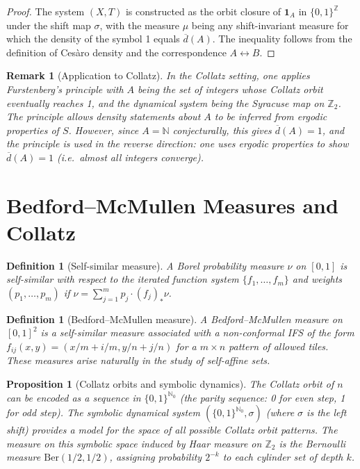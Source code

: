 \documentclass[12pt,a4paper]{article}
\newtheorem{proposition}[theorem]{Proposition}
\newtheorem{definition}[theorem]{Definition}
\newtheorem{remark}[theorem]{Remark}
\begin{document}
\begin{proof}
The system $(X, T)$ is constructed as the orbit closure of $\mathbf{1}_A$ in $\{0,1\}^\mathbb{Z}$
under the shift map $\sigma$, with the measure $\mu$ being any shift-invariant measure
for which the density of the symbol 1 equals $\overline{d}(A)$. The inequality follows
from the definition of Cesàro density and the correspondence $A \leftrightarrow B$.
\end{proof}

\begin{remark}[Application to Collatz]\label{rem:furstenberg_collatz}
In the Collatz setting, one applies Furstenberg's principle with $A$ being the set of
integers whose Collatz orbit eventually reaches 1, and the dynamical system being the
Syracuse map on $\mathbb{Z}_2$. The principle allows density statements about $A$
to be inferred from ergodic properties of $S$. However, since $A = \mathbb{N}$ conjecturally,
this gives $\overline{d}(A) = 1$, and the principle is used in the reverse direction:
one uses ergodic properties to show $\overline{d}(A) = 1$ (i.e.\ almost all integers converge).
\end{remark}

\section{Bedford--McMullen Measures and Collatz}

\begin{definition}[Self-similar measure]\label{def:self_similar}
A Borel probability measure $\nu$ on $[0,1]$ is \emph{self-similar} with respect to
the iterated function system $\{f_1, \ldots, f_m\}$ and weights $(p_1, \ldots, p_m)$
if $\nu = \sum_{j=1}^m p_j \cdot (f_j)_* \nu$.
\end{definition}

\begin{definition}[Bedford--McMullen measure]\label{def:bedford_mcmullen}
A \emph{Bedford--McMullen measure} on $[0,1]^2$ is a self-similar measure associated
with a non-conformal IFS of the form $f_{ij}(x,y) = (x/m + i/m, y/n + j/n)$
for a $m \times n$ pattern of allowed tiles. These measures arise naturally in the
study of self-affine sets.
\end{definition}

\begin{proposition}[Collatz orbits and symbolic dynamics]\label{prop:symbolic}
The Collatz orbit of $n$ can be encoded as a sequence in $\{0,1\}^{\mathbb{N}_0}$
(the parity sequence: 0 for even step, 1 for odd step). The symbolic dynamical system
$(\{0,1\}^{\mathbb{N}_0}, \sigma)$ (where $\sigma$ is the left shift) provides a model
for the space of all possible Collatz orbit patterns.
The measure on this symbolic space induced by Haar measure on $\mathbb{Z}_2$ is the
Bernoulli measure $\mathrm{Ber}(1/2, 1/2)$, assigning probability $2^{-k}$ to each
cylinder set of depth $k$.
\end{proposition}
\end{document}
